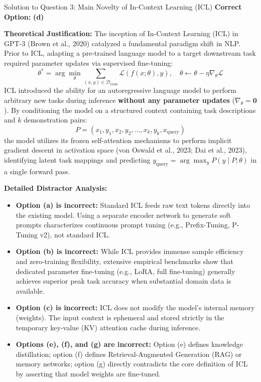 \documentclass[11pt,a4paper]{article}
\begin{document}
\begin{solutionbox}{Solution to Question 3: Main Novelty of In-Context Learning (ICL)}
\textbf{Correct Option:} \textbf{(d)}

\medskip
\textbf{Theoretical Justification:}
The inception of In-Context Learning (ICL) in GPT-3 (Brown et al., 2020) catalyzed a fundamental paradigm shift in NLP. Prior to ICL, adapting a pre-trained language model to a target downstream task required parameter updates via supervised fine-tuning:
\begin{equation}
    \theta^* = \arg\min_{\theta} \sum_{(x, y) \in \mathcal{D}_{\text{train}}} \mathcal{L}(f(x; \theta), y), \quad \theta \leftarrow \theta - \eta \nabla_\theta \mathcal{L}
\end{equation}
ICL introduced the ability for an autoregressive language model to perform arbitrary new tasks during inference \textbf{without any parameter updates} ($\nabla_\theta = \mathbf{0}$). By conditioning the model on a structured context containing task descriptions and $k$ demonstration pairs:
\begin{equation}
    P = (x_1, y_1, x_2, y_2, \dots, x_k, y_k, x_{\text{query}})
\end{equation}
the model utilizes its frozen self-attention mechanisms to perform implicit gradient descent in activation space (von Oswald et al., 2023; Dai et al., 2023), identifying latent task mappings and predicting $y_{\text{query}} = \arg\max_y P(y \mid P; \theta)$ in a single forward pass.

\medskip
\textbf{Detailed Distractor Analysis:}
\begin{itemize}[leftmargin=1.8em]
    \item \textbf{Option (a) is incorrect:} Standard ICL feeds raw text tokens directly into the existing model. Using a separate encoder network to generate soft prompts characterizes continuous prompt tuning (e.g., Prefix-Tuning, P-Tuning v2), not standard ICL.
    \item \textbf{Option (b) is incorrect:} While ICL provides immense sample efficiency and zero-training flexibility, extensive empirical benchmarks show that dedicated parameter fine-tuning (e.g., LoRA, full fine-tuning) generally achieves superior peak task accuracy when substantial domain data is available.
    \item \textbf{Option (c) is incorrect:} ICL does not modify the model's internal memory (weights). The input context is ephemeral and stored strictly in the temporary key-value (KV) attention cache during inference.
    \item \textbf{Options (e), (f), and (g) are incorrect:} Option (e) defines knowledge distillation; option (f) defines Retrieval-Augmented Generation (RAG) or memory networks; option (g) directly contradicts the core definition of ICL by asserting that model weights are fine-tuned.
\end{itemize}
\end{solutionbox}
\end{document}
